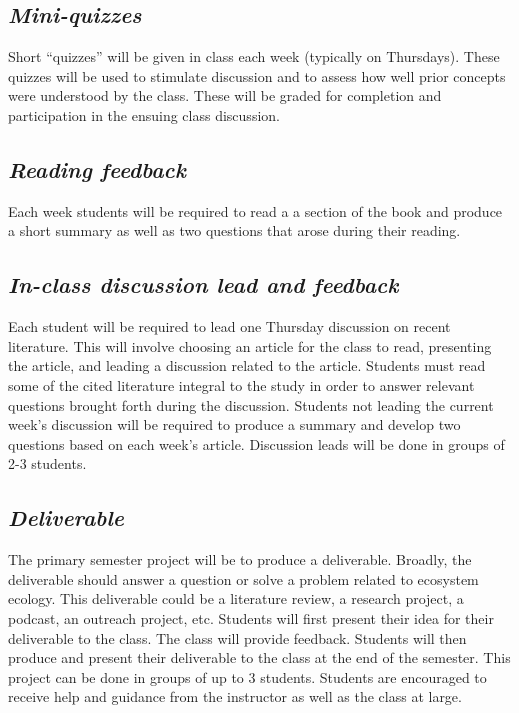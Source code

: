 \documentclass[12pt, notitlepage]{article}   	%
\begin{document}
{\subsection{\textit{Mini-quizzes}}
Short “quizzes” will be given in class each week (typically on Thursdays). 
These quizzes will be used to stimulate discussion and to assess how well 
prior concepts were understood by the class. 
These will be graded for completion and participation in the ensuing class discussion.

\subsection{\textit{Reading feedback}}
Each week students will be required to read a a section of the book 
and produce a short summary as well as two questions that arose during their 
reading. 

\subsection{\textit{In-class discussion lead and feedback}}
Each student will be required to lead one Thursday discussion on recent literature. 
This will involve choosing an article for the class to read, presenting the article, 
and leading a discussion related to the article. Students must read some of the cited
literature integral to the study 
in order to answer relevant questions brought forth during the discussion.
Students not leading the current week’s 
discussion will be required to produce a summary and 
develop two questions based on each week’s article.
Discussion leads will be done in groups of 2-3 students.

\subsection{\textit{Deliverable}}
The primary semester project will be to produce a deliverable.
Broadly, the deliverable should answer a question or solve a problem related 
to ecosystem ecology.
This deliverable could be a literature review, a research project, a podcast, 
an outreach project, etc. Students will first present their idea for their deliverable 
to the class. The class will provide feedback. Students will then produce and present 
their deliverable to the class at the end of the semester. This project can be done
in groups of up to 3 students. Students are encouraged to receive help and guidance 
from the instructor as well as the class at large. 

}
\end{document}
